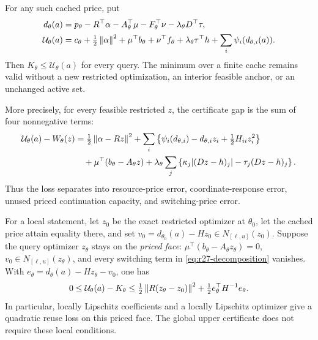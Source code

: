 \begin{theorem}\label{thm:r27-cache}
For any such cached price, put
\begin{align}
 d_\theta(a)&=p_\theta-R^\top\alpha-A_\theta^\top\mu
                    -F_\theta^\top\nu-\lambda_\theta D^\top\tau,\label{eq:r27-residual}\\
 \mathcal U_\theta(a)&=c_\theta+\tfrac12\left\lVert\alpha\right\rVert^2
   +\mu^\top b_\theta+\nu^\top f_\theta
   +\lambda_\theta\tau^\top h+\sum_i\psi_i(d_{\theta,i}(a)).\label{eq:r27-upper}
\end{align}
Then $K_\theta\leq\mathcal U_\theta(a)$ for every query. The minimum over a finite cache remains valid without a new restricted optimization, an interior feasible anchor, or an unchanged active set.

More precisely, for every feasible restricted $z$, the certificate gap is the sum of four nonnegative terms:
\begin{align}
 \mathcal U_\theta(a)-W_\theta(z)
 &=\tfrac12\left\lVert\alpha-Rz\right\rVert^2
 +\sum_i\left\{\psi_i(d_{\theta,i})-d_{\theta,i}z_i+\tfrac12H_{ii}z_i^2\right\}\notag\\
 &\quad+\mu^\top(b_\theta-A_\theta z)
 +\lambda_\theta\sum_j\left\{\kappa_j|(Dz-h)_j|-\tau_j(Dz-h)_j\right\}.
 \label{eq:r27-decomposition}
\end{align}
Thus the loss separates into resource-price error, coordinate-response error, unused priced continuation capacity, and switching-price error.

For a local statement, let $z_0$ be the exact restricted optimizer at $\theta_0$, let the cached price attain equality there, and set
$v_0=d_{\theta_0}(a)-Hz_0\in N_{[\ell,u]}(z_0)$. Suppose the query optimizer $z_\theta$ stays on the \emph{priced face}: $\mu^\top(b_\theta-A_\theta z_\theta)=0$, $v_0\in N_{[\ell,u]}(z_\theta)$, and every switching term in \eqref{eq:r27-decomposition} vanishes. With
$e_\theta=d_\theta(a)-Hz_\theta-v_0$, one has
\begin{equation}\label{eq:r27-quadratic}
 0\leq\mathcal U_\theta(a)-K_\theta
 \leq\tfrac12\left\lVert R(z_\theta-z_0)\right\rVert^2
       +\tfrac12 e_\theta^\top H^{-1}e_\theta.
\end{equation}
In particular, locally Lipschitz coefficients and a locally Lipschitz optimizer give a quadratic reuse loss on this priced face. The global upper certificate does not require these local conditions.
\end{theorem}
